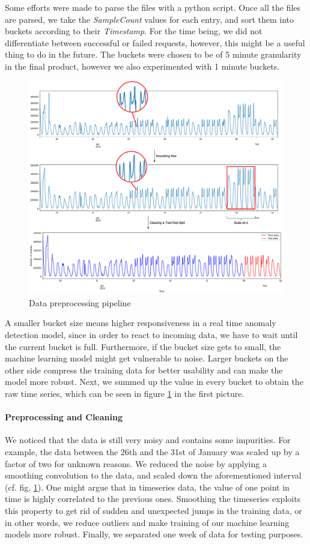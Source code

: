 Some efforts were made to parse the files with a python script. Once all the files are parsed, we take the \textit{SampleCount} values for each entry, and sort them into buckets according to their \textit{Timestamp}. For the time being, we did not differentiate between successful or failed requests, however, this might be a useful thing to do in the future. The buckets were chosen to be of 5 minute granularity in the final product, however we also experimented with 1 minute buckets.
\begin{figure}[h]
    \centering
    \includegraphics[width=1\textwidth]{images/data_preprocessing.png}
    \caption{Data preprocessing pipeline}
    \label{fig:data_preprocessing}
\end{figure}
\afterpage{\FloatBarrier}
A smaller bucket size means higher responsiveness in a real time anomaly detection model, since in order to react to incoming data, we have to wait until the current bucket is full. Furthermore, if the bucket size gets to small, the machine learning model might get vulnerable to noise. Larger buckets on the other side compress the training data for better usability and can make the model more robust. Next, we summed up the value in every bucket to obtain the raw time series, which can be seen in figure \ref{fig:data_preprocessing} in the first picture. 
\paragraph{Preprocessing and Cleaning} 
We noticed that the data is still very noisy and contains some impurities. For example, the data between the 26th and the 31st of January was scaled up by a factor of two for unknown reasons.
We reduced the noise by applying a smoothing convolution to the data, and scaled down the aforementioned interval (cf. fig. \ref{fig:data_preprocessing}).
One might argue that in timeseries data, the value of one point in time is highly correlated to the previous ones. Smoothing the timeseries exploits this property to get rid of sudden and unexpected jumps in the training data, or in other words, we reduce outliers and make training of our machine learning models more robust.
Finally, we separated one week of data for testing purposes.

